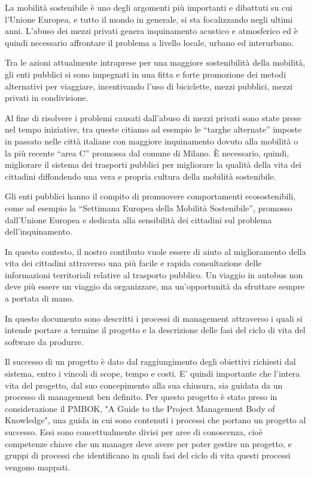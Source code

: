 La mobilit\`{a} sostenibile \`{e} uno degli argomenti pi\`{u} importanti e dibattuti su cui l\rq Unione Europea, e tutto il mondo in generale, si sta focalizzando negli ultimi anni. L\rq abuso dei mezzi privati genera inquinamento acustico e atmosferico ed \`{e} quindi necessario affrontare il problema a livello locale, urbano ed interurbano. 

Tra le azioni attualmente intraprese per una maggiore sostenibilit\`{a} della mobilit\`{a}, gli enti pubblici si sono impegnati in una fitta e forte promozione dei metodi alternativi per viaggiare, incentivando l'uso di biciclette, mezzi pubblici, mezzi privati in condivisione. 

Al fine di risolvere i problemi causati dall\rq abuso di mezzi privati sono state prese nel tempo iniziative, tra queste citiamo ad esempio le ``targhe alternate'' imposte in passato nelle città italiane con maggiore inquinamento dovuto alla mobilità o la più recente ``area C'' promossa dal comune di Milano. \`{E} necessario, quindi, migliorare il sistema dei trasporti pubblici per migliorare la qualit\`{a} della vita dei cittadini diffondendo una vera e propria cultura della mobilit\`{a} sostenibile.

Gli enti pubblici hanno il compito di promuovere comportamenti ecosostenibili, come ad esempio la ``Settimana Europea della Mobilità Sostenibile'', promosso dall'Unione Europea e dedicata alla sensibilit\`{a} dei cittadini sul problema dell\rq inquinamento.

In questo contesto, il nostro contibuto vuole essere di aiuto al miglioramento della vita dei cittadini attraverso una più facile e rapida consultazione delle informazioni territoriali relative al trasporto pubblico. Un viaggio in autobus non deve più essere un viaggio da organizzare, ma un'opportunità da sfruttare sempre a portata di mano. 

In questo documento sono descritti i processi di management attraverso i quali si intende portare a termine il progetto e la descrizione delle fasi del ciclo di vita del software da produrre. 

Il successo di un progetto \`{e} dato dal raggiungimento degli obiettivi richiesti dal sistema, entro i vincoli di scope, tempo e costi. E' quindi importante che l'intera vita del progetto, dal suo concepimento alla sua chiusura, sia guidata da un processo di management ben definito. Per questo progetto è stato preso in considerazione il PMBOK, "A Guide to the Project Management Body of Knowledge", una guida in cui sono contenuti i processi che portano un progetto al successo. Essi sono concettualmente divisi per aree di conoscenza, cio\`{e} competenze chiave che un manager deve avere per poter gestire un progetto, e gruppi di processi che identificano in quali fasi del ciclo di vita questi processi vengono mappati. 

